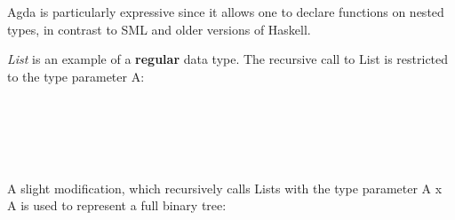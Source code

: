 \documentclass[12pt,twoside,notitlepage]{report}
\begin{document}
Agda is particularly expressive since it allows one to declare functions on nested types, in contrast to SML and older versions of Haskell.

\textit{List} is an example of a \textbf{regular} data type. The recursive call to List is restricted to the type parameter A:

\begin{code}
\\
\>  \AgdaSymbol{(} \AgdaSymbol{:} \AgdaSymbol{)} \AgdaSymbol{:}  \<%
\\
\>[0]\<[2]%
\>[2]\AgdaInductiveConstructor{[]} \AgdaSymbol{:}  \<%
\\
\>[0]\<[2]%
\>[2] \AgdaSymbol{:}       \<%
\\
\end{code}

A slight modification, which recursively calls Lists with the type parameter A x A is used to represent a full binary tree\cite{nested}:

\begin{code}
\\
\>  \AgdaSymbol{(} \AgdaSymbol{:} \AgdaSymbol{)} \AgdaSymbol{:}  \<%
\\
\>[0]\<[2]%
\>[2] \AgdaSymbol{:}  \<%
\\
\>[0]\<[2]%
\>[2] \AgdaSymbol{:}    \AgdaSymbol{(}  \AgdaSymbol{)}   \<%
\\
\end{code}

\begin{code}
\\
\> \AgdaSymbol{:}  \<%
\\
\> \AgdaSymbol{=}   \AgdaSymbol{(} \AgdaSymbol{(} \AgdaInductiveConstructor{,} \AgdaSymbol{)} \AgdaSymbol{(} \AgdaSymbol{((} \AgdaInductiveConstructor{,} \AgdaSymbol{)} \AgdaInductiveConstructor{,} \AgdaSymbol{(} \AgdaInductiveConstructor{,} \AgdaSymbol{))} \AgdaSymbol{))}\<%
\\
\end{code}
\end{document}
